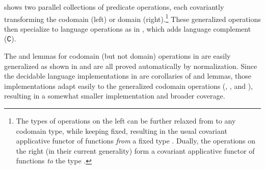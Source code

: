 \documentclass[acmsmall,screen,anonymous,timestamp]{acmart}
\begin{document}
 shows two parallel collections of predicate operations, each covariantly transforming the codomain (left) or domain (right).\footnote{The types of operations on the left can be further relaxed from  to any codomain type, while keeping  fixed, resulting in the usual covariant applicative functor of functions \emph{from} a fixed type \citep{McBride2008APE}.
Dually, the operations on the right (in their current generality) form a covariant applicative functor of functions \emph{to} the type .}
These generalized operations then specialize to language operations as in , which adds language complement (\AF ∁).

\rnc{}
The  and  lemmas for codomain (but not domain) operations in  are easily generalized as shown in  and are all proved automatically by normalization.
Since the decidable language implementations in  are corollaries of  and  lemmas, those implementations adapt easily to the generalized codomain operations (, , and ), resulting in a somewhat smaller implementation and broader coverage.
\end{document}
